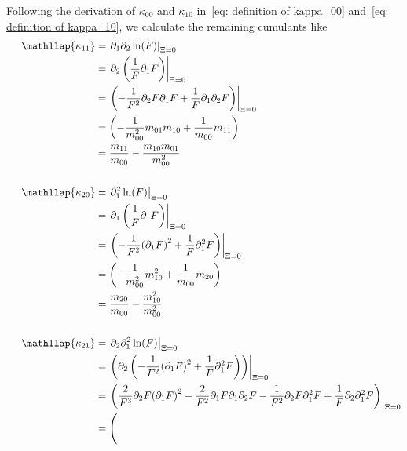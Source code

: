 Following the derivation of $\kappa_{00}$ and $\kappa_{10}$ in~\eqref{eq: definition of kappa_00} and~\eqref{eq: definition of kappa_10}, we calculate the remaining cumulants like
\begin{align*}
  \phantom{\kappa_{11}}
  &\begin{aligned}
  \nonumber
    \mathllap{\kappa_{11}} & = \left.\partial_1 \partial_2 \ln(F) \right|_{\Xi = 0} \\
    & = \left.\partial_2 \left( \frac{1}{F} \partial_1 F \right) \right|_{\Xi = 0} \\
    & = \left.\left( -\frac{1}{F^2} \partial_2 F \partial_1 F + \frac{1}{F} \partial_1\partial_2 F \right) \right|_{\Xi = 0} \\
    & = \left(
      - \frac{1}{m_{00}^2} m_{01} m_{10}
      + \frac{1}{m_{00}} m_{11}
      \right) \\
    & = \frac{m_{11}}{m_{00}} - \frac{m_{10}m_{01}}{m_{00}^2}
  \end{aligned} \\
  \\
  &\begin{aligned}
  \nonumber
  \mathllap{\kappa_{20}} & = \left.\partial_1^2 \ln(F) \right|_{\Xi = 0} \\
  & =  \left.\partial_1 \left( \frac{1}{F} \partial_1 F \right) \right|_{\Xi = 0} \\
  & =  \left.\left( -\frac{1}{F^2} {(\partial_1 F)}^2 + \frac{1}{F} \partial_1^2 F \right) \right|_{\Xi = 0} \\
  & =  \left(
    - \frac{1}{m_{00}^2} m_{10}^2
    + \frac{1}{m_{00}} m_{20}
    \right)\\
  & = \frac{m_{20}}{m_{00}} - \frac{m_{10}^2}{m_{00}^2}
  \end{aligned} \\
  \\
  &\begin{aligned}
  \nonumber
  \mathllap{\kappa_{21}} & =  \left. \partial_2 \partial_1^2 \ln(F) \right|_{\Xi = 0} \\
  & =  \left.\left(\partial_2\left( -\frac{1}{F^2} {(\partial_1 F)}^2 + \frac{1}{F} \partial_1^2 F \right)\right) \right|_{\Xi = 0} \\
  & =  \left.\left(
      \frac{2}{F^3} \partial_2 F {(\partial_1 F)}^2
    - \frac{2}{F^2} \partial_1 F \partial_1 \partial_2 F
    - \frac{1}{F^2} \partial_2 F \partial_1^2 F
    + \frac{1}{F} \partial_2 \partial_1^2 F
    \right)\right|_{\Xi = 0}\\
  & =  \Bigg(

\end{aligned}
\end{align*}
